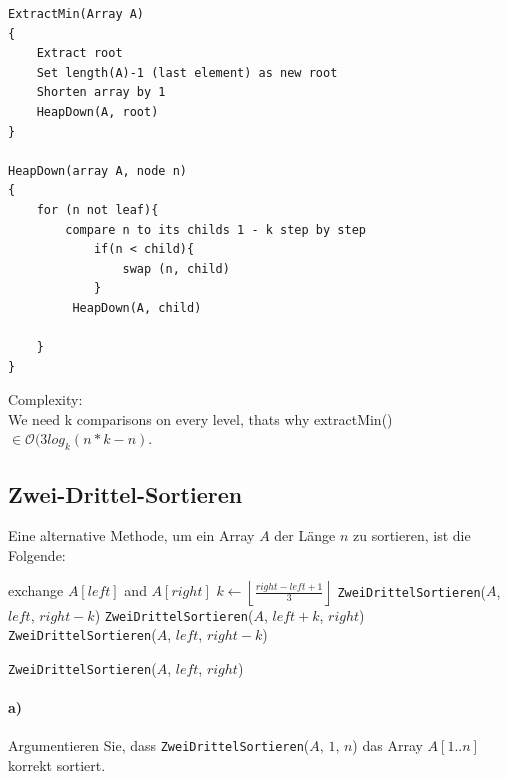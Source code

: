 \documentclass[paper=a4, fontsize=11pt]{scrartcl}
\numberwithin{equation}{section}
\numberwithin{figure}{section}
\numberwithin{table}{section}
\begin{document}
\begin{lstlisting}
ExtractMin(Array A)
{
	Extract root
    Set length(A)-1 (last element) as new root
    Shorten array by 1
    HeapDown(A, root)
}

HeapDown(array A, node n)
{
	for (n not leaf){
    	compare n to its childs 1 - k step by step
        	if(n < child){
            	swap (n, child)                
            }
         HeapDown(A, child)
             
    }
}

\end{lstlisting}
Complexity:\\
We need k comparisons on every level, thats why extractMin() $\in \mathcal{O}(3 log_k(n*k - n) $.\\

\subsection{Zwei-Drittel-Sortieren}
Eine alternative Methode, um ein Array $A$ der Länge $n$ zu sortieren, ist die Folgende:

\begin{algorithm}[H]
	 {
		exchange $A[left]$ and $A[right]$ \;
	}
	 {
		\Return \;
	}
	$k \longleftarrow \left\lfloor \frac{right - left + 1}3 \right\rfloor$ \;
	\texttt{ZweiDrittelSortieren}($A$, $left$, $right-k$)\;
	\texttt{ZweiDrittelSortieren}($A$, $left+k$, $right$)\;
	\texttt{ZweiDrittelSortieren}($A$, $left$, $right-k$)\;
 \caption{\texttt{ZweiDrittelSortieren}($A$, $left$, $right$)}
 \label{algo:ZweiDrittelSortieren}
\end{algorithm}

\paragraph{a)}
Argumentieren Sie, dass \texttt{ZweiDrittelSortieren}($A$, $1$, $n$) das Array $A[1..n]$ korrekt sortiert. \\
\end{document}

